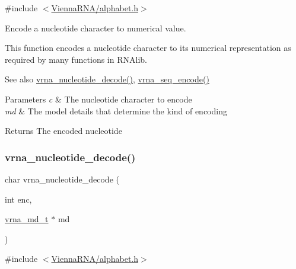 {\ttfamily \#include $<$\mbox{\hyperlink{alphabet_8h}{Vienna\+R\+N\+A/alphabet.\+h}}$>$}



Encode a nucleotide character to numerical value. 

This function encodes a nucleotide character to its numerical representation as required by many functions in R\+N\+Alib.

\begin{DoxySeeAlso}{See also}
\mbox{\hyperlink{group__alphabet__utils_ga48ef585e697be9c8a08ed68c655e29b6}{vrna\+\_\+nucleotide\+\_\+decode()}}, \mbox{\hyperlink{group__alphabet__utils_ga636e7d6f888fd639587296a5eddea660}{vrna\+\_\+seq\+\_\+encode()}}
\end{DoxySeeAlso}

\begin{DoxyParams}{Parameters}
{\em c} & The nucleotide character to encode \\
\hline
{\em md} & The model details that determine the kind of encoding \\
\hline
\end{DoxyParams}
\begin{DoxyReturn}{Returns}
The encoded nucleotide 
\end{DoxyReturn}
\mbox{\label{group__alphabet__utils_ga48ef585e697be9c8a08ed68c655e29b6}} 
\subsubsection{\texorpdfstring{vrna\_nucleotide\_decode()}{vrna\_nucleotide\_decode()}}
{\footnotesize\ttfamily char vrna\+\_\+nucleotide\+\_\+decode (\begin{DoxyParamCaption}\item[{int}]{enc,  }\item[{\mbox{\hyperlink{group__model__details_ga1f8a10e12a0a1915f2a4eff0b28ea17c}{vrna\+\_\+md\+\_\+t}} $\ast$}]{md }\end{DoxyParamCaption})}



{\ttfamily \#include $<$\mbox{\hyperlink{alphabet_8h}{Vienna\+R\+N\+A/alphabet.\+h}}$>$}



